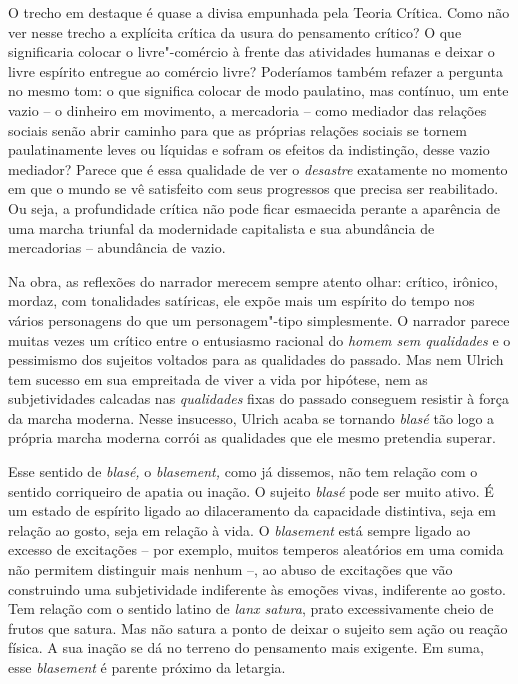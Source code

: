O trecho em destaque é quase a divisa empunhada pela Teoria Crítica.
Como não ver nesse trecho a explícita crítica da usura do pensamento
crítico? O que significaria colocar o livre"-comércio à frente das
atividades humanas e deixar o livre espírito entregue ao comércio livre?
Poderíamos também refazer a pergunta no mesmo tom: o que significa
colocar de modo paulatino, mas contínuo, um ente vazio -- o dinheiro em
movimento, a mercadoria -- como mediador das relações sociais senão
abrir caminho para que as próprias relações sociais se tornem
paulatinamente leves ou líquidas e sofram os efeitos da indistinção,
desse vazio mediador? Parece que é essa qualidade de ver o
\emph{desastre} exatamente no momento em que o mundo se vê satisfeito
com seus progressos que precisa ser reabilitado. Ou seja, a profundidade
crítica não pode ficar esmaecida perante a aparência de uma marcha
triunfal da modernidade capitalista e sua abundância de mercadorias --
abundância de vazio.

Na obra, as reflexões do narrador merecem sempre atento olhar: crítico,
irônico, mordaz, com tonalidades satíricas, ele expõe mais um espírito
do tempo nos vários personagens do que um personagem"-tipo simplesmente.
O narrador parece muitas vezes um crítico entre o entusiasmo racional do
\emph{homem sem qualidades} e o pessimismo dos sujeitos voltados para as
qualidades do passado. Mas nem Ulrich tem sucesso em sua empreitada de
viver a vida por hipótese, nem as subjetividades calcadas nas
\emph{qualidades} fixas do passado conseguem resistir à força da marcha
moderna. Nesse insucesso, Ulrich acaba se tornando \emph{blasé} tão logo
a própria marcha moderna corrói as qualidades que ele mesmo pretendia
superar.

Esse sentido de \emph{blasé,} o \emph{blasement,} como já dissemos, não
tem relação com o sentido corriqueiro de apatia ou inação. O sujeito
\emph{blasé} pode ser muito ativo. É um estado de espírito ligado ao
dilaceramento da capacidade distintiva, seja em relação ao gosto, seja
em relação à vida. O \emph{blasement} está sempre ligado ao excesso de
excitações -- por exemplo, muitos temperos aleatórios em uma comida não
permitem distinguir mais nenhum --, ao abuso de excitações que vão
construindo uma subjetividade indiferente às emoções vivas, indiferente
ao gosto. Tem relação com o sentido latino de \emph{lanx satura}, prato
excessivamente cheio de frutos que satura. Mas não satura a ponto de
deixar o sujeito sem ação ou reação física. A sua inação se dá no
terreno do pensamento mais exigente. Em suma, esse \emph{blasement} é
parente próximo da letargia.

